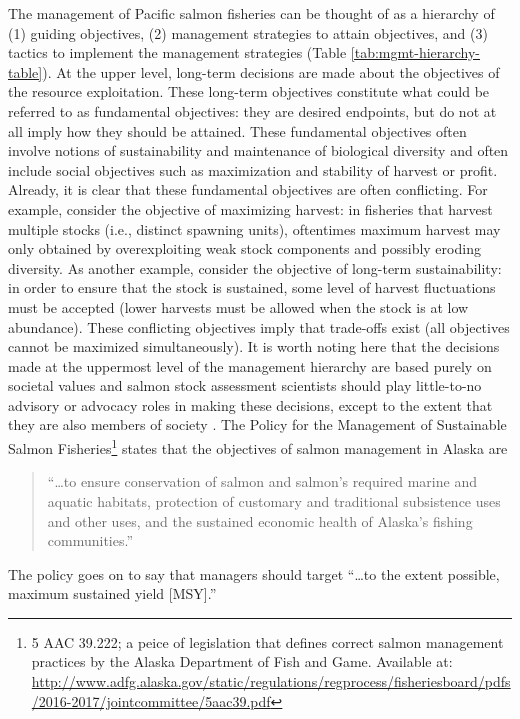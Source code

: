 \documentclass[12pt,]{book}
\let\rmarkdownfootnote\footnote%
\def\footnote{\protect\rmarkdownfootnote}
\theoremstyle{definition}
\theoremstyle{definition}
\theoremstyle{definition}
\theoremstyle{remark}
\begin{document}
The management of Pacific salmon fisheries can be thought of as a
hierarchy of (1) guiding objectives, (2) management strategies to attain
objectives, and (3) tactics to implement the management strategies
(Table \ref{tab:mgmt-hierarchy-table}). At the upper level, long-term
decisions are made about the objectives of the resource exploitation.
These long-term objectives constitute what could be referred to as
fundamental objectives: they are desired endpoints, but do not at all
imply how they should be attained. These fundamental objectives often
involve notions of sustainability and maintenance of biological
diversity and often include social objectives such as maximization and
stability of harvest or profit. Already, it is clear that these
fundamental objectives are often conflicting. For example, consider the
objective of maximizing harvest: in fisheries that harvest multiple
stocks (i.e., distinct spawning units), oftentimes maximum harvest may
only obtained by overexploiting weak stock components and possibly
eroding diversity. As another example, consider the objective of
long-term sustainability: in order to ensure that the stock is
sustained, some level of harvest fluctuations must be accepted (lower
harvests must be allowed when the stock is at low abundance). These
conflicting objectives imply that trade-offs exist (all objectives
cannot be maximized simultaneously). It is worth noting here that the
decisions made at the uppermost level of the management hierarchy are
based purely on societal values and salmon stock assessment scientists
should play little-to-no advisory or advocacy roles in making these
decisions, except to the extent that they are also members of society
\citep{walters-martell-2004}. The Policy for the Management of
Sustainable Salmon Fisheries\footnote{5 AAC 39.222; a peice of
  legislation that defines correct salmon management practices by the
  Alaska Department of Fish and Game. Available at:
  \url{http://www.adfg.alaska.gov/static/regulations/regprocess/fisheriesboard/pdfs/2016-2017/jointcommittee/5aac39.pdf}}
states that the objectives of salmon management in Alaska are

\begin{quote}
``\ldots{}to ensure conservation of salmon and salmon's required marine
and aquatic habitats, protection of customary and traditional
subsistence uses and other uses, and the sustained economic health of
Alaska's fishing communities.''
\end{quote}

\noindent
The policy goes on to say that managers should target ``\ldots{}to the
extent possible, maximum sustained yield {[}MSY{]}.''
\end{document}
